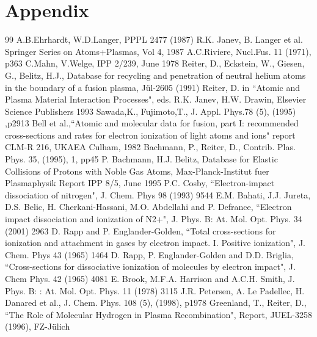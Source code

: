 \documentclass[12pt,dvipdfmx]{article}
\begin{document}
\section{Appendix}
\newpage
\begin{thebibliography}{99}
  A.B.Ehrhardt, W.D.Langer, PPPL 2477 (1987)
 R.K. Janev, B. Langer et al.  Springer Series on Atoms+Plasmas,
                   Vol 4, 1987
 A.C.Riviere, Nucl.Fus. 11 (1971), p363
 C.Mahn, V.Welge, IPP 2/239, June 1978
 Reiter, D., Eckstein, W., Giesen, G., Belitz,
                    H.J.,
                    Database for recycling and penetration of neutral
                    helium atoms in the boundary of a fusion plasma,
                    J\"ul-2605 (1991)
  Reiter, D. in ``Atomic and Plasma Material Interaction Processes", eds. R.K. Janev, H.W. Drawin, Elsevier Science Publishers 1993
 Sawada,K.,  Fujimoto,T., J. Appl. Phys.78 (5), (1995)
                    ,p2913
  Bell et al.,``Atomic and molecular data for fusion, part I:
recommended cross-sections and rates for electron ionization of light atoms and ions"
 report CLM-R 216, UKAEA Culham, 1982
  Bachmann, P., Reiter, D., Contrib. Plas. Phys.
                       35, (1995), 1, pp45
 P. Bachmann, H.J. Belitz, Database for Elastic Collisions of Protons
with Noble Gas Atoms, Max-Planck-Institut fuer Plasmaphysik Report IPP 8/5, June 1995
  P.C. Cosby, ``Electron-impact dissociation of nitrogen", J. Chem. Phys 98 (1993) 9544
 E.M. Bahati, J.J. Jureta, D.S. Belic, H. Cherkani-Hassani, M.O. Abdellahi and P. Defrance, ``Electron impact dissociation and ionization of N2+",
J. Phys. B: At. Mol. Opt. Phys. 34 (2001) 2963
 D. Rapp and P. Englander-Golden, ``Total cross-sections for ionization and attachment in gases by electron impact. I. Positive ionization", J. Chem. Phys 43 (1965) 1464
 D. Rapp, P. Englander-Golden and D.D. Briglia, ``Cross-sections for dissociative ionization of molecules by electron impact", J. Chem Phys. 42 (1965) 4081
 E. Brook, M.F.A. Harrison and A.C.H. Smith, J. Phys. B: : At. Mol. Opt. Phys. 11 (1978) 3115
 J.R. Petersen, A. Le Padellec, H. Danared et al., J. Chem. Phys. 108 (5), (1998), p1978
 Greenland, T., Reiter, D.,
                   ``The Role of Molecular Hydrogen in Plasma
                    Recombination", Report, JUEL-3258 (1996), FZ-J\"ulich

\end{thebibliography}
\end{document}
